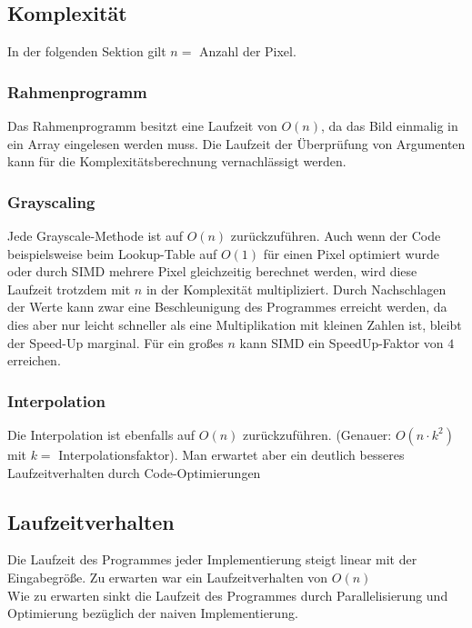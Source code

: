 \documentclass[course=erap]{aspdoc}
\begin{document}
\subsection{Komplexität}
In der folgenden Sektion gilt $n =$ Anzahl der Pixel.

\subsubsection{Rahmenprogramm}
Das Rahmenprogramm besitzt eine Laufzeit von $O(n)$, da das Bild einmalig in ein Array eingelesen werden muss. Die Laufzeit der Überprüfung von Argumenten kann für die Komplexitätsberechnung vernachlässigt werden.

\subsubsection{Grayscaling}
Jede Grayscale-Methode ist auf $O(n)$ zurückzuführen. Auch wenn der Code beispielsweise beim Lookup-Table auf $O(1)$ für einen Pixel optimiert wurde oder durch SIMD mehrere Pixel gleichzeitig berechnet werden, wird diese Laufzeit trotzdem mit $n$ in der Komplexität multipliziert. Durch Nachschlagen der Werte kann zwar eine Beschleunigung des Programmes erreicht werden, da dies aber nur leicht schneller als eine Multiplikation mit kleinen Zahlen ist, bleibt der Speed-Up marginal. Für ein großes $n$ kann SIMD ein SpeedUp-Faktor von $4$ erreichen.

\subsubsection{Interpolation}
Die Interpolation ist ebenfalls auf $O(n)$ zurückzuführen. (Genauer: $O(n \cdot k^{2})$ mit $k =$ Interpolationsfaktor). Man erwartet aber ein deutlich besseres Laufzeitverhalten durch Code-Optimierungen

\subsection{Laufzeitverhalten}
Die Laufzeit des Programmes jeder Implementierung steigt linear mit der Eingabegröße. Zu erwarten war ein Laufzeitverhalten von $O(n)$\\
Wie zu erwarten sinkt die Laufzeit des Programmes durch Parallelisierung und Optimierung bezüglich der naiven Implementierung.
\end{document}
